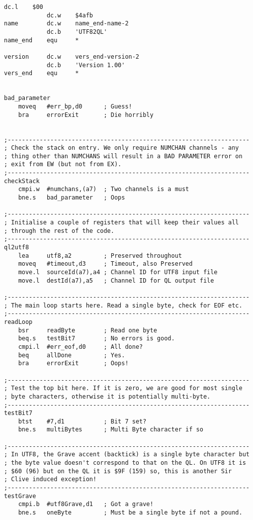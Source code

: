\begin{lstlisting}[firstnumber=1, caption={Wolfgang's improved utf82ql Utility}]
            dc.l    $00
            dc.w    $4afb
name        dc.w    name_end-name-2
            dc.b    'UTF82QL'
name_end    equ     *

version     dc.w    vers_end-version-2
            dc.b    'Version 1.00'
vers_end    equ     *


bad_parameter
    moveq   #err_bp,d0      ; Guess!
    bra     errorExit       ; Die horribly


;--------------------------------------------------------------------
; Check the stack on entry. We only require NUMCHAN channels - any
; thing other than NUMCHANS will result in a BAD PARAMETER error on
; exit from EW (but not from EX).
;--------------------------------------------------------------------
checkStack
    cmpi.w  #numchans,(a7)  ; Two channels is a must
    bne.s   bad_parameter   ; Oops

;--------------------------------------------------------------------
; Initialise a couple of registers that will keep their values all
; through the rest of the code.
;--------------------------------------------------------------------
ql2utf8
    lea     utf8,a2         ; Preserved throughout
    moveq   #timeout,d3     ; Timeout, also Preserved
    move.l  sourceId(a7),a4 ; Channel ID for UTF8 input file
    move.l  destId(a7),a5   ; Channel ID for QL output file

;--------------------------------------------------------------------
; The main loop starts here. Read a single byte, check for EOF etc.
;--------------------------------------------------------------------
readLoop
    bsr     readByte        ; Read one byte
    beq.s   testBit7        ; No errors is good.
    cmpi.l  #err_eof,d0     ; All done?
    beq     allDone         ; Yes.
    bra     errorExit       ; Oops!

;--------------------------------------------------------------------
; Test the top bit here. If it is zero, we are good for most single
; byte characters, otherwise it is potentially multi-byte. 
;--------------------------------------------------------------------
testBit7
    btst    #7,d1           ; Bit 7 set?
    bne.s   multiBytes      ; Multi Byte character if so

;--------------------------------------------------------------------
; In UTF8, the Grave accent (backtick) is a single byte character but
; the byte value doesn't correspond to that on the QL. On UTF8 it is
; $60 (96) but on the QL it is $9F (159) so, this is another Sir
; Clive induced exception!
;--------------------------------------------------------------------
testGrave
    cmpi.b  #utf8Grave,d1   ; Got a grave!
    bne.s   oneByte         ; Must be a single byte if not a pound.


\end{lstlisting}
